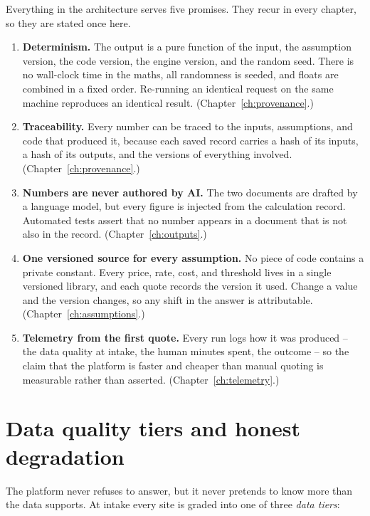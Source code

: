 Everything in the architecture serves five promises. They recur in every chapter, so they are stated once here.

\begin{enumerate}
  \item \textbf{Determinism.} The output is a pure function of the input, the assumption version, the code version, the engine version, and the random seed. There is no wall-clock time in the maths, all randomness is seeded, and floats are combined in a fixed order. Re-running an identical request on the same machine reproduces an identical result. (Chapter~\ref{ch:provenance}.)
  \item \textbf{Traceability.} Every number can be traced to the inputs, assumptions, and code that produced it, because each saved record carries a hash of its inputs, a hash of its outputs, and the versions of everything involved. (Chapter~\ref{ch:provenance}.)
  \item \textbf{Numbers are never authored by AI.} The two documents are drafted by a language model, but every figure is injected from the calculation record. Automated tests assert that no number appears in a document that is not also in the record. (Chapter~\ref{ch:outputs}.)
  \item \textbf{One versioned source for every assumption.} No piece of code contains a private constant. Every price, rate, cost, and threshold lives in a single versioned library, and each quote records the version it used. Change a value and the version changes, so any shift in the answer is attributable. (Chapter~\ref{ch:assumptions}.)
  \item \textbf{Telemetry from the first quote.} Every run logs how it was produced -- the data quality at intake, the human minutes spent, the outcome -- so the claim that the platform is faster and cheaper than manual quoting is measurable rather than asserted. (Chapter~\ref{ch:telemetry}.)
\end{enumerate}

\section{Data quality tiers and honest degradation}

The platform never refuses to answer, but it never pretends to know more than the data supports. At intake every site is graded into one of three \emph{data tiers}:

